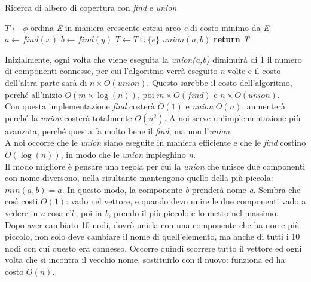 \begin{algorithm}
	\caption{Ricerca di albero di copertura con \textit{find} e \textit{union}}\label{alg:AC2}
	\begin{algorithmic}[1]
			\State $T \gets \phi$  
			\State ordina \textit{E} in maniera crescente
				\State estrai arco \textit{e} di costo minimo da \textit{E}
				\State $a \gets find(x)$
				\State $b \gets find(y)$
					\State $T \gets T \cup \{e\}$
					\State $union(a,b)$
				\EndIf
			\EndWhile
			\State \textbf{return} \textit{T}
		\EndFunction
	\end{algorithmic}
\end{algorithm}
Inizialmente, ogni volta che viene eseguita la \textit{union(a,b)} diminuirà di 1 il numero di componenti connesse, per cui l'algoritmo verrà eseguito \textit{n} volte e il costo dell'altra parte sarà di $n\times O(union)$. Questo sarebbe il costo dell'algoritmo, perché all'inizio $O(m \times \log(n))$, poi $m\times O(find)$ e $n\times O(union)$. \\
Con questa implementazione \textit{find} costerà $O(1)$ e \textit{union} $O(n)$, aumenterà perché la \textit{union} costerà totalmente $O(n^2)$. A noi serve un'implementazione più avanzata, perché questa fa molto bene il \textit{find}, ma non l'\textit{union}. \\
A noi occorre che le \textit{union} siano eseguite in maniera efficiente e che le \textit{find} costino $O(\log(n))$, in modo che le \textit{union} impieghino \textit{n}. \\
Il modo migliore è pensare una regola per cui la \textit{union} che unisce due componenti con nome diversono, nella risultante mantengono quello della più piccola: $min(a,b) = a$. In questo modo, la componente \textit{b} prenderà nome \textit{a}. Sembra che così costi $O(1)$: vado nel vettore, e quando devo unire le due componenti vado a vedere in \textit{a} cosa c'è, poi in \textit{b}, prendo il più piccolo e lo metto nel massimo. \\
Dopo aver cambiato 10 nodi, dovrò unirla con una componente che ha nome più piccolo, non solo deve cambiare il nome di quell'elemento, ma anche di tutti i 10 nodi con cui questo era connesso. Occorre quindi scorrere tutto il vettore ed ogni volta che si incontra il vecchio nome, sostituirlo con il nuovo: funziona ed ha costo $O(n)$.


